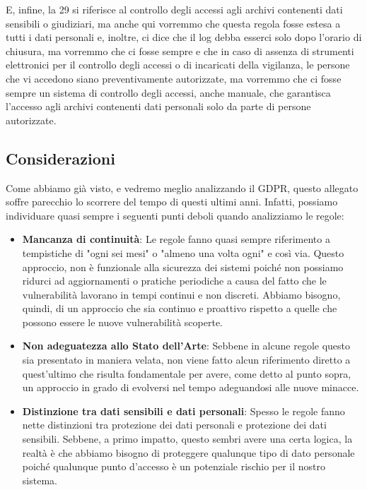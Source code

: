 E, infine, la 29 si riferisce al controllo degli accessi agli archivi contenenti dati sensibili o giudiziari, ma anche qui vorremmo che questa regola fosse estesa a tutti i dati personali e, inoltre, ci dice che il log debba esserci solo dopo l'orario di chiusura, ma vorremmo che ci fosse sempre e che in caso di assenza di strumenti elettronici per il controllo degli accessi o di incaricati della vigilanza, le persone che vi accedono siano preventivamente autorizzate, ma vorremmo che ci fosse sempre un sistema di controllo degli accessi, anche manuale, che garantisca l'accesso agli archivi contenenti dati personali solo da parte di persone autorizzate.

\subsection{Considerazioni}
Come abbiamo già visto, e vedremo meglio analizzando il GDPR, questo allegato soffre parecchio lo scorrere del tempo di questi ultimi anni. Infatti, possiamo individuare quasi sempre i seguenti punti deboli quando analizziamo le regole:
\begin{itemize}
    \item \textbf{Mancanza di continuità}: Le regole fanno quasi sempre riferimento a tempistiche di "ogni sei mesi" o "almeno una volta ogni" e così via. Questo approccio, non è funzionale alla sicurezza dei sistemi poiché non possiamo ridurci ad aggiornamenti o pratiche periodiche a causa del fatto che le vulnerabilità lavorano in tempi continui e non discreti. Abbiamo bisogno, quindi, di un approccio che sia continuo e proattivo rispetto a quelle che possono essere le nuove vulnerabilità scoperte.
    \item \textbf{Non adeguatezza allo Stato dell'Arte}: Sebbene in alcune regole questo sia presentato in maniera velata, non viene fatto alcun riferimento diretto a quest'ultimo che risulta fondamentale per avere, come detto al punto sopra, un approccio in grado di evolversi nel tempo adeguandosi alle nuove minacce.
    \item \textbf{Distinzione tra dati sensibili e dati personali}: Spesso le regole fanno nette distinzioni tra protezione dei dati personali e protezione dei dati sensibili. Sebbene, a primo impatto, questo sembri avere una certa logica, la realtà è che abbiamo bisogno di proteggere qualunque tipo di dato personale poiché qualunque punto d'accesso è un potenziale rischio per il nostro sistema.
\end{itemize}

